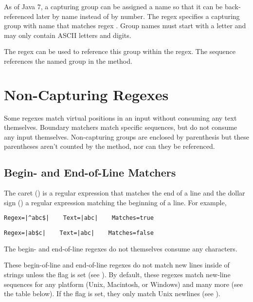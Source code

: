 As of Java 7,
a capturing group can be assigned a name
so that it can be back-referenced later by name instead of by number.
The regex  specifies a capturing group with name 
that matches regex .
Group names must start with a letter and may only contain ASCII letters and digits.

The regex  can be used to reference this group within the regex.
The sequence  references the named group in the  method.


\section{Non-Capturing Regexes}\label{section:non-capturing-regex}

Some regexes match virtual positions in an input without consuming any
text themselves.  
Boundary matchers match specific sequences, but do not consume any
input themselves.  
Non-capturing groups are enclosed by parenthesis but these parentheses
aren't counted by the  method, nor can they
be referenced.


\subsection{Begin- and End-of-Line Matchers}

The caret (\code{\^{}}) is a regular expression that matches the end
of a line and the dollar sign (\code{\$}) a regular expression
matching the beginning of a line.  For example, 
%
\begin{verbatim}
Regex=|^abc$|    Text=|abc|    Matches=true
\end{verbatim}
%
\begin{verbatim}
Regex=|ab$c|    Text=|abc|    Matches=false
\end{verbatim}
%
The begin- and end-of-line regexes do not themselves consume any
characters.

These begin-of-line and end-of-line regexes do not match new lines
inside of strings unless the  flag is set (see
).  By default, these regexes match new-line
sequences for any platform (Unix, Macintosh, or Windows) and many more
(see the table below).  If
the
 flag is set, they only match Unix newlines (see
).

